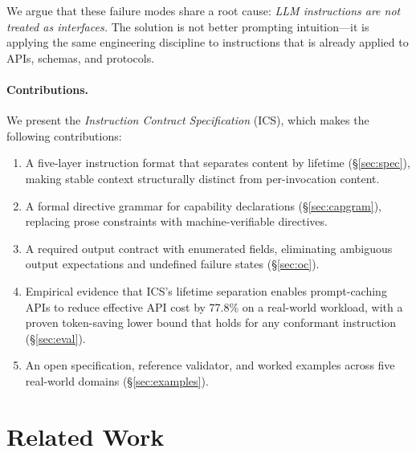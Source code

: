 \documentclass[11pt]{article}
\begin{document}
We argue that these failure modes share a root cause: \emph{LLM instructions
are not treated as interfaces.} The solution is not better prompting
intuition---it is applying the same engineering discipline to instructions
that is already applied to APIs, schemas, and protocols.

\paragraph{Contributions.} We present the \emph{Instruction Contract
Specification} (ICS), which makes the following contributions:

\begin{enumerate}[leftmargin=*]
\item A five-layer instruction format that separates content by lifetime
(\S\ref{sec:spec}), making stable context structurally distinct from
per-invocation content.

\item A formal directive grammar for capability declarations
(\S\ref{sec:capgram}), replacing prose constraints with machine-verifiable
directives.

\item A required output contract with enumerated fields, eliminating
ambiguous output expectations and undefined failure states (\S\ref{sec:oc}).

\item Empirical evidence that ICS's lifetime separation enables prompt-caching
APIs to reduce effective API cost by 77.8\% on a real-world workload, with a
proven token-saving lower bound that holds for any conformant instruction
(\S\ref{sec:eval}).

\item An open specification, reference validator, and worked examples across
five real-world domains (\S\ref{sec:examples}).
\end{enumerate}

\section{Related Work}
\label{sec:related}
\end{document}
